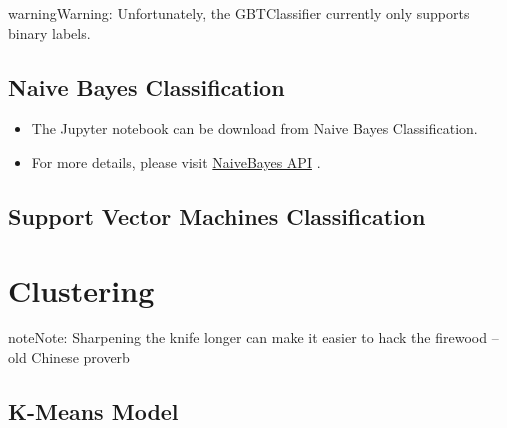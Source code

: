 \documentclass[letterpaper,11pt,english]{sphinxmanual}
\begin{document}
\begin{notice}{warning}{Warning:}
Unfortunately, the GBTClassifier currently only supports binary labels.
\end{notice}


\section{Naive Bayes Classification}
\label{classification:naive-bayes-classification}\begin{itemize}
\item {} 
The Jupyter notebook can be download from Naive Bayes Classification.

\item {} 
For more details, please visit \href{http://takwatanabe.me/pyspark/generated/generated/ml.classification.NaiveBayes.html}{NaiveBayes API} .

\end{itemize}


\section{Support Vector Machines Classification}
\label{classification:support-vector-machines-classification}

\chapter{Clustering}
\label{clustering:naivebayes-api}\label{clustering:clustering}\label{clustering::doc}\label{clustering:id1}
\begin{notice}{note}{Note:}
Sharpening the knife longer can make it easier to hack the firewood -- old Chinese proverb
\end{notice}


\section{K-Means Model}
\label{clustering:k-means-model}
\end{document}
